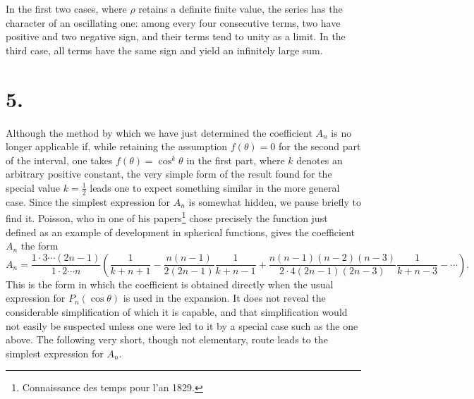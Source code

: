 \documentclass[11pt]{article}
\begin{document}
In the first two cases, where $\rho$ retains a definite finite value, the series has the character of an oscillating one: among every four consecutive terms, two have positive and two negative sign, and their terms tend to unity as a limit. In the third case, all terms have the same sign and yield an infinitely large sum.

\section*{5.}

Although the method by which we have just determined the coefficient $A_n$ is no longer applicable if, while retaining the assumption $f(\theta)=0$ for the second part of the interval, one takes $f(\theta)=\cos^k\theta$ in the first part, where $k$ denotes an arbitrary positive constant, the very simple form of the result found for the special value $k=\frac12$ leads one to expect something similar in the more general case. Since the simplest expression for $A_n$ is somewhat hidden, we pause briefly to find it. Poisson, who in one of his papers\footnote{Connaissance des temps pour l'an 1829.} chose precisely the function just defined as an example of development in spherical functions, gives the coefficient $A_n$ the form
\[
 A_n=\frac{1\cdot3\cdots(2n-1)}{1\cdot2\cdots n}\left(\frac1{k+n+1}-\frac{n(n-1)}{2(2n-1)}\frac1{k+n-1}
 +\frac{n(n-1)(n-2)(n-3)}{2\cdot4(2n-1)(2n-3)}\frac1{k+n-3}-\cdots\right).
\]
This is the form in which the coefficient is obtained directly when the usual expression for $P_n(\cos\theta)$ is used in the expansion. It does not reveal the considerable simplification of which it is capable, and that simplification would not easily be suspected unless one were led to it by a special case such as the one above. The following very short, though not elementary, route leads to the simplest expression for $A_n$.
\end{document}
